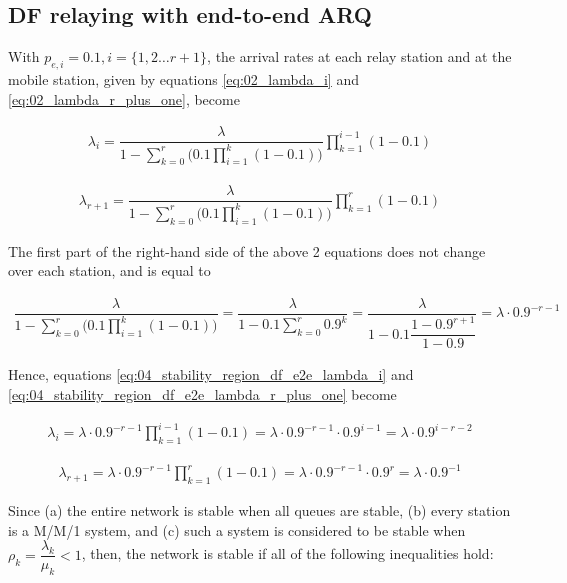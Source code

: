 \subsection{DF relaying with end-to-end ARQ}

With $p_{e,i} = 0.1, i = \{1,2 \dots r+1\}$, the arrival rates at each relay
station and at the mobile station, given by equations \ref{eq:02_lambda_i}
and \ref{eq:02_lambda_r_plus_one}, become

\begin{align}
  \lambda_i = \dfrac{\lambda}{1 - \sum\limits_{k=0}^r \Big(0.1 \prod\limits_{i=1}^k (1 - 0.1)\Big)} \prod\limits_{k=1}^{i-1} (1 - 0.1)
  \label{eq:04_stability_region_df_e2e_lambda_i}
\end{align}

\begin{align}
  \lambda_{r+1} = \dfrac{\lambda}{1 - \sum\limits_{k=0}^r \Big(0.1 \prod\limits_{i=1}^k (1 - 0.1)\Big)} \prod\limits_{k=1}^{r} (1 - 0.1)
  \label{eq:04_stability_region_df_e2e_lambda_r_plus_one}
\end{align}

The first part of the right-hand side of the above 2 equations does not change
over each station, and is equal to

\begin{align*}
  \dfrac{\lambda}{1 - \sum\limits_{k=0}^r \Big(0.1 \prod\limits_{i=1}^k (1 - 0.1)\Big)} =
  \dfrac{\lambda}{1 - 0.1 \sum\limits_{k=0}^r 0.9^k} =
  \dfrac{\lambda}{1 - 0.1 \dfrac{1 - 0.9^{r+1}}{1- 0.9}} =
  \lambda \cdot 0.9^{-r-1}
\end{align*}

Hence, equations \ref{eq:04_stability_region_df_e2e_lambda_i} and
\ref{eq:04_stability_region_df_e2e_lambda_r_plus_one} become

\begin{align*}
  \lambda_i = \lambda \cdot 0.9^{-r-1} \prod\limits_{k=1}^{i-1} (1 - 0.1) = \lambda \cdot 0.9^{-r-1} \cdot 0.9^{i-1} = \lambda \cdot 0.9^{i-r-2}
\end{align*}

\begin{align*}
  \lambda_{r+1} = \lambda \cdot 0.9^{-r-1} \prod\limits_{k=1}^{r} (1 - 0.1) = \lambda \cdot 0.9^{-r-1} \cdot 0.9^r = \lambda \cdot 0.9^{-1}
\end{align*}

Since (a) the entire network is stable when all queues are stable, (b) every
station is a M/M/1 system, and (c) such a system is considered to be stable
when $\rho_k = \dfrac{\lambda_k}{\mu_k} < 1$, then, the network is stable if all
of the following inequalities hold:

